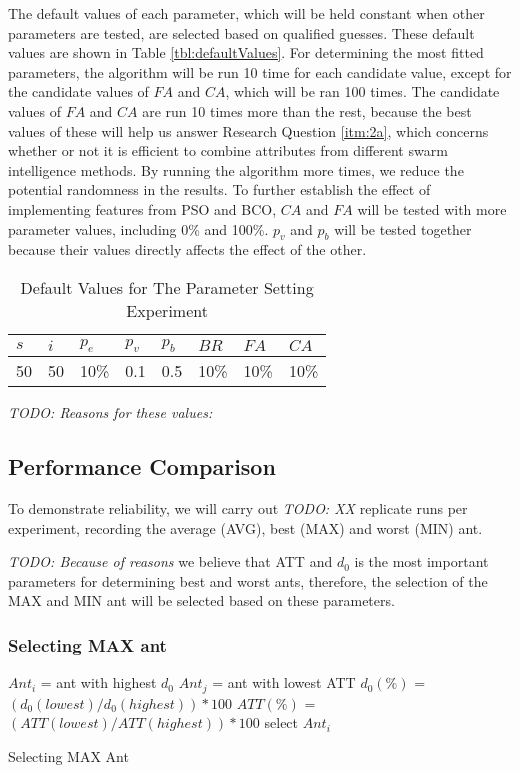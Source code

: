 The default values of each parameter, which will be held constant when other parameters are tested, are selected based on qualified guesses. These default values are shown in Table \vref{tbl:defaultValues}. For determining the most fitted parameters, the algorithm will be run 10 time for each candidate value, except for the candidate values of $FA$ and $CA$, which will be ran 100 times. The candidate values of $FA$ and $CA$ are run 10 times more than the rest, because the best values of these will help us answer Research Question \vref{itm:2a}, which concerns whether or not it is efficient to combine attributes from different swarm intelligence methods. By running the algorithm more times, we reduce the potential randomness in the results. To further establish the effect of implementing features from PSO and BCO, $CA$ and $FA$ will be tested with more parameter values, including 0\% and 100\%. $p_{v}$ and $p_{b}$ will be tested together because their values directly affects the effect of the other. 
 

\begin{table}[H]
\label{tbl:defaultValues}
	\centering
    \begin{tabular}{|l|l|l|l|l|l|l|l|}
 	\hline
 	$s$ & $i$ & $p_{e}$ & $p_{v}$ & $p_{b}$ & $BR$  & $FA$ & $CA$  \\
 	\hline
    50 & 50 & 10\% & 0.1 & 0.5 & 10\% & 10\%  & 10\%  \\
	\hline
    \end{tabular}
    \caption {Default Values for The Parameter Setting Experiment} \emph{\color{blue} TODO: Reasons for these values:}
    \label{table:parameter_defaultValues}
	\end{table}

\subsection{Performance Comparison}

To demonstrate reliability, we will carry out \emph{\color{blue} TODO: XX } replicate runs per experiment, recording the average (AVG), best (MAX) and worst (MIN) ant.  

\emph{\color{blue} TODO: Because of reasons }we believe that ATT and $d_0$ is the most important parameters for determining best and worst ants, therefore, the selection of the MAX and MIN ant will be selected based on these parameters. 

\subsubsection{Selecting MAX ant}
\begin{algorithm}[H]
$Ant_{i}$ = ant with highest $d_0$\;
$Ant_{j}$ = ant with lowest ATT\;
{
	$d_0(\%)$ = $(d_0(lowest) / d_0(highest))*100$\;
	$ATT(\%)$ = $(ATT(lowest) / ATT(highest))*100$\;
	{
		select $Ant_{i}$
	}
}
 \caption{Selecting MAX Ant}
\end{algorithm}


